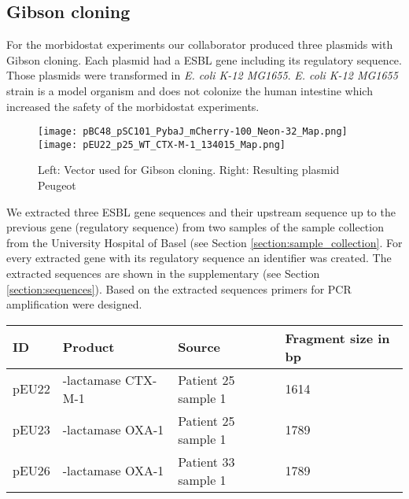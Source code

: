 \subsection{Gibson cloning}
For the morbidostat experiments our collaborator produced three plasmids with Gibson cloning. Each plasmid had a ESBL gene including its regulatory sequence. Those plasmids were transformed in \textit{E. coli K-12 MG1655}. \textit{E. coli K-12 MG1655} strain is a model organism and does not colonize the human intestine \cite{k-12} which increased the safety of the morbidostat experiments. \\
\begin{figure}
	\texttt{[image: pBC48\_pSC101\_PybaJ\_mCherry-100\_Neon-32\_Map.png]}
	\texttt{[image: pEU22\_p25\_WT\_CTX-M-1\_134015\_Map.png]}
	\caption{Left: Vector used for Gibson cloning. Right: Resulting plasmid Peugeot}
	\label{figure:vec}
\end{figure}
We extracted three ESBL gene sequences and their upstream sequence up to the previous gene (regulatory sequence) from two samples of the sample collection from the University Hospital of Basel (see Section \ref{section:sample_collection}. For every extracted gene with its regulatory sequence an identifier was created. The extracted sequences are shown in the supplementary (see Section \ref{section:sequences}). Based on the extracted sequences primers for PCR amplification were designed.
\begin{table}[H]
	\begin{tabular}{|llll|} \hline
		ID    & Product                & Source             	& Fragment size in bp \\ \hline
		pEU22 & \textbeta-lactamase CTX-M-1 & Patient 25 sample 1 &	1614 \\ \hline
		pEU23 & \textbeta-lactamase OXA-1   & Patient 25 sample 1 & 1789\\ \hline
		pEU26 & \textbeta-lactamase OXA-1   & Patient 33 sample 1 & 1789\\ \hline
	\end{tabular}
	\label{table:plasmid}
\end{table}
